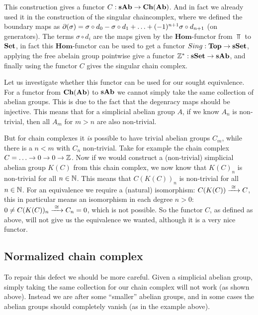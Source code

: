 This construction gives a functor $C : \mathbf{sAb} \to \mathbf{Ch}(\mathbf{Ab})$. And in fact we already used it in the construction of the singular chaincomplex, where we defined the boundary maps as $\partial(\sigma) = \sigma \circ d_0 - \sigma \circ d_1 + \ldots + (-1)^{n+1} \sigma \circ d_{n+1}$ (on generators). The terms $\sigma \circ d_i$ are the maps given by the $\mathbf{Hom}$-functor from $\Top$ to $\mathbf{Set}$, in fact this $\mathbf{Hom}$-functor can be used to get a functor $Sing : \mathbf{Top} \to \mathbf{sSet}$, applying the free abelain group pointwise give a functor $\mathbb{Z}^\ast : \mathbf{sSet} \to \mathbf{sAb}$, and finally using the functor $C$ gives the singular chain complex.

Let us investigate whether this functor can be used for our sought equivalence. For a functor from $\mathbf{Ch}(\mathbf{Ab})$ to $\mathbf{sAb}$ we cannot simply take the same collection of abelian groups. This is due to the fact that the degenracy maps should be injective. This means that for a simplicial abelian group $A$, if we know $A_n$ is non-trivial, then all $A_m$ for $m > n$ are also non-trivial.

But for chain complexes it \emph{is} possible to have trivial abelian groups $C_m$, while there is a $n < m$ with $C_n$ non-trivial. Take for example the chain complex $ C = \ldots \to 0 \to 0 \to \mathbb{Z} $. Now if we would construct a (non-trivial) simplicial abelian group $K(C)$ from this chain complex, we now know that $K(C)_n$ is non-trivial for all $n \in \mathbb{N}$. This means that $C(K(C))_n$ is non-trivial for all $n \in \mathbb{N}$. For an equivalence we require a (natural) isomorphism: $C(K(C)) \xrightarrow{\,\,{\cong}\,\,} C$, this in particular means an isomorphism in each degree $n > 0$: $ 0 \neq C(K(C))_n \xrightarrow{\,\,{\cong}\,\,} C_n = 0 $, which is not possible. So the functor $C$, as defined as above, will not give us the equivalence we wanted, although it is a very nice functor.

\subsection{Normalized chain complex}
To repair this defect we should be more careful. Given a simplicial abelian group, simply taking the same collection for our chain complex will not work (as shown above). Instead we are after some ``smaller'' abelian groups, and in some cases the abelian groups should completely vanish (as in the example above).

